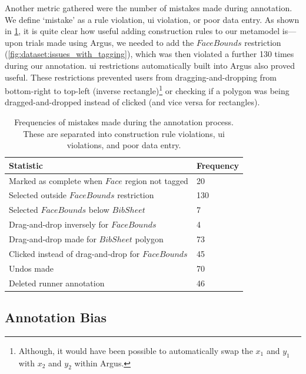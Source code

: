 Another metric gathered were the number of mistakes made during annotation. We define `mistake' as a rule violation, \gls{ui} violation, or poor data entry. As shown in \cref{tab:dataset:argus:metrics:mistakes}, it is quite clear how useful adding construction rules to our metamodel is---upon trials made using Argus, we needed to add the $FaceBounds$ restriction (\cref{fig:dataset:issues_with_tagging}), which was then violated a further 130 times during our annotation. \gls{ui} restrictions automatically built into Argus also proved useful. These restrictions  prevented users from dragging-and-dropping from bottom-right to top-left (inverse rectangle)\footnote{Although, it would have been possible to automatically swap the $x_{1}$ and $y_{1}$ with $x_{2}$ and $y_{2}$ within Argus.} or checking if a polygon was being dragged-and-dropped instead of clicked (and vice versa for rectangles).

\begin{table}[h]
  \centering
  \caption[Mistakes using Argus]{Frequencies of mistakes made during the annotation process. These are separated into construction rule violations, \gls{ui} violations, and poor data entry.}
  \label{tab:dataset:argus:metrics:mistakes}
  \begin{tabular}{@{}ll@{}}
    \toprule
    \textbf{Statistic}                                & \textbf{Frequency} \\ \midrule
    Marked as complete when $Face$ region not tagged  & 20                 \\
    Selected outside $FaceBounds$ restriction         & 130                \\
    Selected $FaceBounds$ below $BibSheet$            & 7                  \\
    \midrule
    Drag-and-drop inversely for $FaceBounds$          & 4                  \\
    Drag-and-drop made for $BibSheet$ polygon         & 73                 \\
    Clicked instead of drag-and-drop for $FaceBounds$ & 45                 \\
    \midrule
    Undos made                                        & 70                 \\
    Deleted runner annotation                         & 46                 \\ \bottomrule
  \end{tabular}
\end{table}

\subsection{Annotation  Bias}


